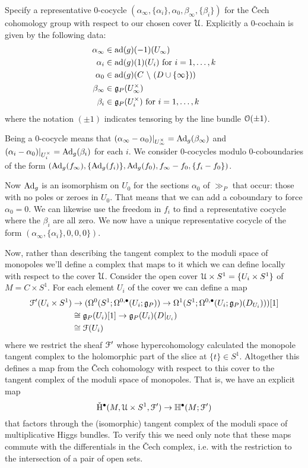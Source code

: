 \documentclass[10pt, oneside]{article}
\renewcommand{\ad}{\mr{ad}}
\begin{document}
Specify a representative 0-cocycle $(\alpha_\infty, \{\alpha_i\}, \alpha_0, \beta_\infty, \{\beta_i\})$ for the \v Cech cohomology group with respect to our chosen cover $\mathcal{U}$.  Explicitly a 0-cochain is given by the following data:
\begin{align*}
 \alpha_\infty &\in \ad(g)(-1)(U_\infty) \\
 \alpha_i &\in \ad(g)(1)(U_i) \text{ for } i = 1,\ldots,k \\
 \alpha_0 &\in \ad(g)(C \bs (D \cup \{\infty\})) \\
 \beta_\infty &\in \gg_P(U^\times_\infty) \\
 \beta_i &\in \gg_P(U^\times_i) \text{ for } i=1,\ldots,k
\end{align*}
where the notation $(\pm 1)$ indicates tensoring by the line bundle $\mathcal{O}(\pm 1)$.

Being a 0-cocycle means that $(\alpha_\infty - \alpha_0)|_{U^\times_\infty} = \mathrm{Ad}_g(\beta_\infty)$ and $(\alpha_i - \alpha_0)|_{U^\times_i} = \mathrm{Ad}_g(\beta_i)$ for each $i$.  We consider 0-cocycles modulo 0-coboundaries of the form $(\mathrm{Ad}_g(f_\infty), \{\mathrm{Ad}_g(f_i)\}, \mathrm{Ad}_g(f_0), f_\infty -  f_0, \{f_i - f_0\})$.  

Now $\mathrm{Ad}_g$ is an isomorphism on $U_0$ for the sections $\alpha_0$ of $\gg_P$ that occur: those with no poles or zeroes in $U_0$.  That means that we can add a coboundary to force $\alpha_0=0$.  We can likewise use the freedom in $f_i$ to find a representative cocycle where the $\beta_i$ are all zero.  We now have a unique representative cocycle of the form $(\alpha_\infty, \{\alpha_i\}, 0,0,0\})$.

Now, rather than describing the tangent complex to the moduli space of monopoles we'll define a complex that maps to it which we can define locally with respect to the cover $\mathcal{U}$.  Consider the open cover $\mathcal{U} \times S^1 = \{U_i \times S^1\}$ of $M = C \times S^1$.  For each element $U_i$ of the cover we can define a map
\begin{align*}
\mc F'(U_i \times S^1) &\to (\Omega^0(S^1; \Omega^{0,\bullet}(U_i; \gg_P)) \to \Omega^1(S^1; \Omega^{0,\bullet}(U_i; \gg_P)(D_{U_i})))[1] \\ %
&\iso \gg_P(U_i)[1] \to \gg_P(U_i)(D|_{U_i}) \\
&\iso \mc F(U_i)
\end{align*}
where we restrict the sheaf $\mathcal{F}'$ whose hypercohomology calculated the monopole tangent complex to the holomorphic part of the slice at $\{t\} \in S^1$.  Altogether this defines a map from the \v Cech cohomology with respect to this cover to the tangent complex of the moduli space of monopoles.  That is, we have an explicit map
\[{\mathrm{\check H}}^\bullet(M, \mathcal{U} \times S^1, \mathcal{F}') \to \mathbb{H}^\bullet(M; \mathcal{F}')\]
that factors through the (isomorphic) tangent complex of the moduli space of multiplicative Higgs bundles.  To verify this we need only note that these maps commute with the differentials in the \v Cech complex, i.e. with the restriction to the intersection of a pair of open sets. 
\end{document}
